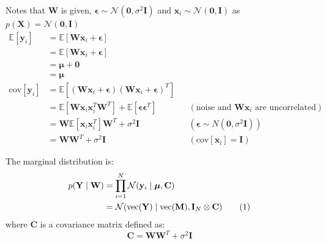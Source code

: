 \documentclass[12pt]{article}
\newenvironment{question}[2][Question]{\begin{trivlist}
\kern10pt
\item[\hskip \labelsep {\bfseries #1}\hskip \labelsep {\bfseries #2.}]}{\end{trivlist}}
\newcommand\numberthis{\addtocounter{equation}{1}\tag{\theequation}}
\begin{document}
\begin{question}{13}
Notes that $\mathbf{W}$ is given, $\bm{\epsilon} \sim \mathcal{N}(\mathbf{0}, \sigma^2\mathbf{I})$
 and $\mathbf{x}_i \sim \mathcal{N}(\mathbf{0}, \mathbf{I})$ as 
 $p(\mathbf{X}) = \mathcal{N}(\mathbf{0}, \mathbf{I})$
\begin{align*}
  \mathbb{E}[\mathbf{y}_i] &= \mathbb{E}[\mathbf{W}\mathbf{x}_i + \bm{\epsilon}] \\ 
  &= \mathbb{E}[\mathbf{W}\mathbf{x}_i + \bm{\epsilon}] \\
  &= \bm{\mu} + \mathbf{0} \\
  &= \bm{\mu} \\
  \text{cov}[\mathbf{y}_i] 
  &= \mathbb{E}[(\mathbf{W}\mathbf{x}_i + \bm{\epsilon})
                (\mathbf{W}\mathbf{x}_i + \bm{\epsilon})^{T}] \\
  &= \mathbb{E}[\mathbf{W}\mathbf{x}_i\mathbf{x}_i^T\mathbf{W}^T]
     + \mathbb{E}[\bm{\epsilon}\bm{\epsilon}^{T}]
     && (\text{noise and }\mathbf{W}\mathbf{x}_i\text{ are uncorrelated}) \\
  &= \mathbf{W}\mathbb{E}[\mathbf{x}_i\mathbf{x}_i^T]\mathbf{W}^T + \sigma^2 \mathbf{I}
     && (\bm{\epsilon} \sim N(\mathbf{0}, \sigma^2\mathbf{I})) \\
  &= \mathbf{W}\mathbf{W}^T + \sigma^2\mathbf{I}
     && (\text{cov}[\mathbf{x}_i] = \mathbf{I})
\end{align*}

The marginal distribution is:
\begin{align*}
  p(\mathbf{Y}\mid\mathbf{W}) 
  &= \prod_{i=1}^{N} 
    \mathcal{N}(\mathbf{y}_i\mid\bm{\mu}, \mathbf{C}) \\
  &= \mathcal{N}(\text{vec}(\mathbf{Y})\mid\text{vec}(\mathbf{M}), \mathbf{I}_N\otimes\mathbf{C})
  \numberthis  \label{eq:q13-result}
\end{align*}
where $\mathbf{C}$ is a covariance matrix defined as:
\begin{equation}\label{eq:q13-matC}
  \mathbf{C} = \mathbf{W}\mathbf{W}^T + \sigma^2\mathbf{I}
\end{equation}
\end{question}
\end{document}
